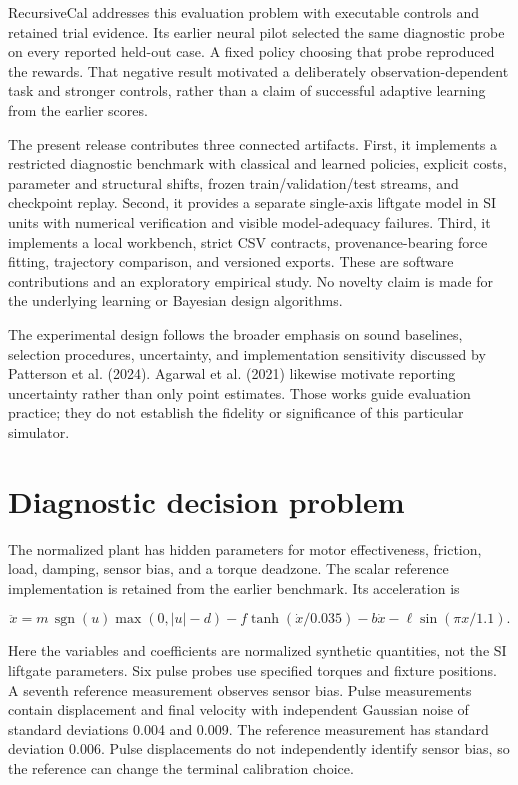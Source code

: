 \documentclass[
  10pt,
]{article}
\begin{document}
RecursiveCal addresses this evaluation problem with executable controls
and retained trial evidence. Its earlier neural pilot selected the same
diagnostic probe on every reported held-out case. A fixed policy
choosing that probe reproduced the rewards. That negative result
motivated a deliberately observation-dependent task and stronger
controls, rather than a claim of successful adaptive learning from the
earlier scores.

The present release contributes three connected artifacts. First, it
implements a restricted diagnostic benchmark with classical and learned
policies, explicit costs, parameter and structural shifts, frozen
train/validation/test streams, and checkpoint replay. Second, it
provides a separate single-axis liftgate model in SI units with
numerical verification and visible model-adequacy failures. Third, it
implements a local workbench, strict CSV contracts, provenance-bearing
force fitting, trajectory comparison, and versioned exports. These are
software contributions and an exploratory empirical study. No novelty
claim is made for the underlying learning or Bayesian design algorithms.

The experimental design follows the broader emphasis on sound baselines,
selection procedures, uncertainty, and implementation sensitivity
discussed by Patterson et al. (2024). Agarwal et al. (2021) likewise
motivate reporting uncertainty rather than only point estimates. Those
works guide evaluation practice; they do not establish the fidelity or
significance of this particular simulator.

\section{Diagnostic decision problem}\label{diagnostic-decision-problem}

The normalized plant has hidden parameters for motor effectiveness,
friction, load, damping, sensor bias, and a torque deadzone. The scalar
reference implementation is retained from the earlier benchmark. Its
acceleration is

\[
\ddot x = m\,\operatorname{sgn}(u)\max(0,|u|-d)
          - f\tanh(\dot x/0.035)-b\dot x
          -\ell\sin(\pi x/1.1).
\]

Here the variables and coefficients are normalized synthetic quantities,
not the SI liftgate parameters. Six pulse probes use specified torques
and fixture positions. A seventh reference measurement observes sensor
bias. Pulse measurements contain displacement and final velocity with
independent Gaussian noise of standard deviations 0.004 and 0.009. The
reference measurement has standard deviation 0.006. Pulse displacements
do not independently identify sensor bias, so the reference can change
the terminal calibration choice.
\end{document}
